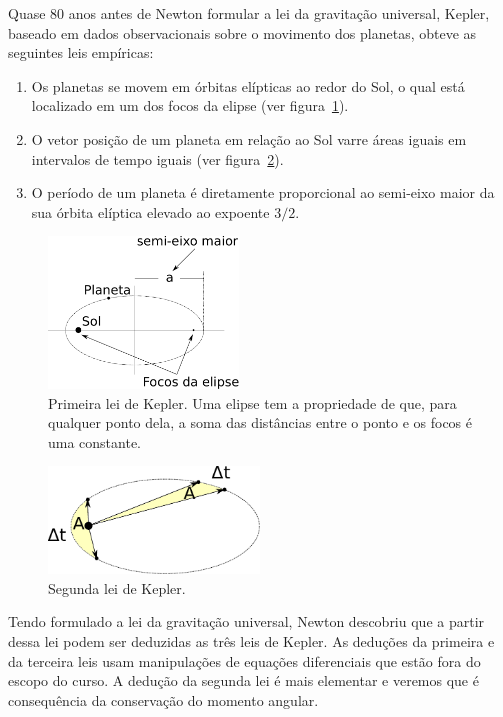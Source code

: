 \documentclass[twocolumn=on,fontsize=12pt,DIV=calc]{scrartcl}
\theoremstyle{definition}
\begin{document}
Quase 80 anos antes de Newton formular a lei da gravitação universal,
Kepler, baseado em dados observacionais sobre o movimento dos
planetas, obteve as seguintes leis empíricas:
\begin{enumerate}
\item Os planetas se movem em órbitas elípticas ao redor do Sol, o
  qual está localizado em um dos focos da elipse (ver
  figura~\ref{fig:orbitaeliptica}).
\item O vetor posição de um planeta em relação ao Sol varre áreas
  iguais em intervalos de tempo iguais (ver
  figura~\ref{fig:leikepler2}).
\item O período de um planeta é diretamente proporcional ao semi-eixo
  maior da sua órbita elíptica elevado ao expoente $3/2$.
\end{enumerate}
\begin{figure}[ht]
  \centering
  \includegraphics[width=0.45\textwidth,keepaspectratio]{aux/orbitaeliptica.pdf}
  \caption{Primeira lei de Kepler. Uma elipse tem a propriedade de
    que, para qualquer ponto dela, a soma das distâncias entre o ponto
    e os focos é uma constante.}
  \label{fig:orbitaeliptica}
\end{figure}
\begin{figure}[ht]
  \centering
  \includegraphics[width=0.5\textwidth,keepaspectratio]{aux/leikepler2.pdf}
  \caption{Segunda lei de Kepler.}
  \label{fig:leikepler2}
\end{figure}

Tendo formulado a lei da gravitação universal, Newton descobriu que a
partir dessa lei podem ser deduzidas as três leis de Kepler. As
deduções da primeira e da terceira leis usam manipulações de equações
diferenciais que estão fora do escopo do curso. A dedução da segunda
lei é mais elementar e veremos que é consequência da conservação do
momento angular.
\end{document}
